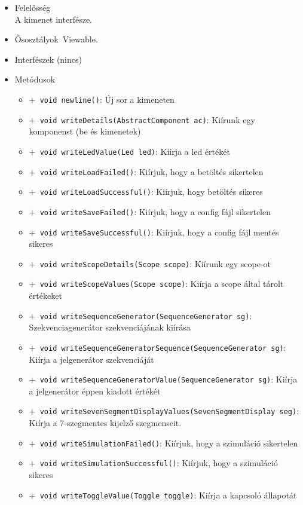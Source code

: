 \begin{itemize}
\item Felelősség\\
A kimenet interfésze.
\item Ősosztályok\ Viewable.
\item Interfészek (nincs)
\item Metódusok$\ $
\begin{itemize}
	\item[] \texttt{$+$ void newline()}: Új sor a kimeneten
	\item[] \texttt{$+$ void writeDetails(AbstractComponent ac)}: Kiírunk egy komponenst (be és kimenetek)
	\item[] \texttt{$+$ void writeLedValue(Led led)}: Kiírja a led értékét
	\item[] \texttt{$+$ void writeLoadFailed()}: Kiírjuk, hogy a betöltés sikertelen
	\item[] \texttt{$+$ void writeLoadSuccessful()}: Kiírjuk, hogy betöltés sikeres
	\item[] \texttt{$+$ void writeSaveFailed()}: Kiírjuk, hogy a config fájl sikertelen
	\item[] \texttt{$+$ void writeSaveSuccessful()}: Kiírjuk, hogy a config fájl mentés sikeres
	\item[] \texttt{$+$ void writeScopeDetails(Scope scope)}: Kiírunk egy scope-ot
	\item[] \texttt{$+$ void writeScopeValues(Scope scope)}: Kiírja a scope által tárolt értékeket
	\item[] \texttt{$+$ void writeSequenceGenerator(SequenceGenerator sg)}: Szekvenciagenerátor szekvenciájának kiírása
	\item[] \texttt{$+$ void writeSequenceGeneratorSequence(SequenceGenerator sg)}: Kiírja a jelgenerátor szekvenciáját
	\item[] \texttt{$+$ void writeSequenceGeneratorValue(SequenceGenerator sg)}: Kiírja a jelgenerátor éppen kiadott értékét
	\item[] \texttt{$+$ void writeSevenSegmentDisplayValues(SevenSegmentDisplay seg)}: Kiírja a 7-szegmentes kijelző szegmenseit.
	\item[] \texttt{$+$ void writeSimulationFailed()}: Kiírjuk, hogy a szimuláció sikertelen
	\item[] \texttt{$+$ void writeSimulationSuccessful()}: Kiírjuk, hogy a szimuláció sikeres
	\item[] \texttt{$+$ void writeToggleValue(Toggle toggle)}: Kiírja a kapcsoló állapotát
\end{itemize}
\end{itemize}

